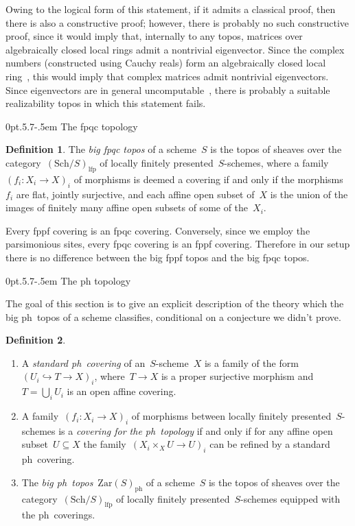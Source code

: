 \documentclass[10pt,reqno,a4paper]{amsbook}
\makeatletter
\theoremstyle{definition}
\newtheorem{defn}{Definition}[section]
\theoremstyle{plain}
\theoremstyle{remark}
\newcommand{\Zar}{\mathrm{Zar}}
\newcommand{\ph}{\mathrm{ph}}
\newcommand{\Sch}{\mathrm{Sch}}
\newcommand{\lfp}{\mathrm{lfp}}
\newcommand{\?}{\,{:}\,}
\renewcommand{\_}{\mathpunct{.}\,}
\def\subsection{\@startsection{subsection}{2}%
  {0pt}{.5\linespacing\@plus.7\linespacing}{-.5em}%
  {\normalfont\bfseries}}
\makeatother
\begin{document}
\begin{itemize}
Owing to the logical form of this statement, if it admits a classical proof, then there is also a
constructive proof; however, there is probably no such constructive proof,
since it would imply that, internally to any topos, matrices over
algebraically closed local rings admit a
nontrivial eigenvector. Since the complex numbers (constructed using Cauchy
reals) form an algebraically closed local
ring~\cite[Theorem~3.13]{ruitenburg:roots}, this would imply that complex
matrices admit nontrivial eigenvectors. Since eigenvectors are in general
uncomputable~\cite[Proposition~12]{ziegler:brattka:spectrum}, there is probably
a suitable realizability topos in which this statement fails.
\end{itemize}


\subsection{The fpqc topology}

\begin{defn}The \emph{big fpqc topos} of a scheme~$S$ is the topos of sheaves
over the category~$(\Sch/S)_\lfp$ of locally finitely presented~$S$-schemes, where a
family~$(f_i : X_i \to X)_i$ of morphisms is deemed a covering if and only if
the morphisms~$f_i$ are flat, jointly surjective, and each affine open subset
of~$X$ is the union of the images of finitely many affine open subsets of some of
the~$X_i$.
\end{defn}

Every fppf covering is an fpqc covering. Conversely, since we employ the
parsimonious sites, every fpqc covering is an fppf covering. Therefore in our
setup there is no difference between the big fppf topos and the big fpqc topos.


\subsection{The ph topology}

The goal of this section is to give an explicit description of the theory which
the big ph~topos of a scheme classifies, conditional on a conjecture we
didn't prove.

\begin{defn}\begin{enumerate}
\item A \emph{standard ph~covering} of an~$S$-scheme~$X$ is a family of
the form~$(U_i \hookrightarrow T \to X)_i$, where~$T \to X$ is a proper
surjective morphism and~$T = \bigcup_i U_i$ is an open affine covering.
\item A family~$(f_i : X_i \to X)_i$ of morphisms between locally finitely
presented~$S$-schemes is a \emph{covering for the ph~topology} if and
only if for any affine open subset~$U \subseteq X$ the family~$(X_i \times_X U
\to U)_i$ can be refined by a standard ph~covering.
\item The \emph{big ph~topos}~$\Zar(S)_\ph$ of a scheme~$S$ is the topos of
sheaves over the category~$(\Sch/S)_\lfp$ of locally finitely
presented~$S$-schemes equipped with the ph~coverings.
\end{enumerate}
\end{defn}
\end{document}
